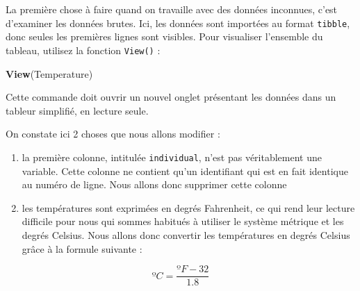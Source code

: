 \documentclass[
  a4paper,
]{article}
\newenvironment{Shaded}{\begin{snugshade}}{\end{snugshade}}
\newcommand{\CommentTok}[1]{\textcolor[rgb]{0.54,0.53,0.53}{#1}}
\newcommand{\DataTypeTok}[1]{\textcolor[rgb]{0.00,0.34,0.68}{#1}}
\newcommand{\DecValTok}[1]{\textcolor[rgb]{0.69,0.50,0.00}{#1}}
\newcommand{\FloatTok}[1]{\textcolor[rgb]{0.69,0.50,0.00}{#1}}
\newcommand{\KeywordTok}[1]{\textcolor[rgb]{0.12,0.11,0.11}{\textbf{#1}}}
\newcommand{\NormalTok}[1]{\textcolor[rgb]{0.12,0.11,0.11}{#1}}
\newcommand{\OperatorTok}[1]{\textcolor[rgb]{0.12,0.11,0.11}{#1}}
\newcommand{\StringTok}[1]{\textcolor[rgb]{0.75,0.01,0.01}{#1}}
\providecommand{\tightlist}{%
  \setlength{\itemsep}{0pt}\setlength{\parskip}{0pt}}
\begin{document}
La première chose à faire quand on travaille avec des données inconnues, c'est d'examiner les données brutes. Ici, les données sont importées au format \texttt{tibble}, donc seules les premières lignes sont visibles. Pour visualiser l'ensemble du tableau, utilisez la fonction \texttt{View()} :

\begin{Shaded}
\begin{Highlighting}[]
\KeywordTok{View}\NormalTok{(Temperature)}
\end{Highlighting}
\end{Shaded}

Cette commande doit ouvrir un nouvel onglet présentant les données dans un tableur simplifié, en lecture seule.

On constate ici 2 choses que nous allons modifier :

\begin{enumerate}
\def\labelenumi{\arabic{enumi}.}
\tightlist
\item
  la première colonne, intitulée \texttt{individual}, n'est pas véritablement une variable. Cette colonne ne contient qu'un identifiant qui est en fait identique au numéro de ligne. Nous allons donc supprimer cette colonne
\item
  les températures sont exprimées en degrés Fahrenheit, ce qui rend leur lecture difficile pour nous qui sommes habitués à utiliser le système métrique et les degrés Celsius. Nous allons donc convertir les températures en degrés Celsius grâce à la formule suivante :
\end{enumerate}

\[ºC = \frac{ºF - 32}{1.8}\]

\begin{Shaded}
\end{Shaded}
\end{document}
